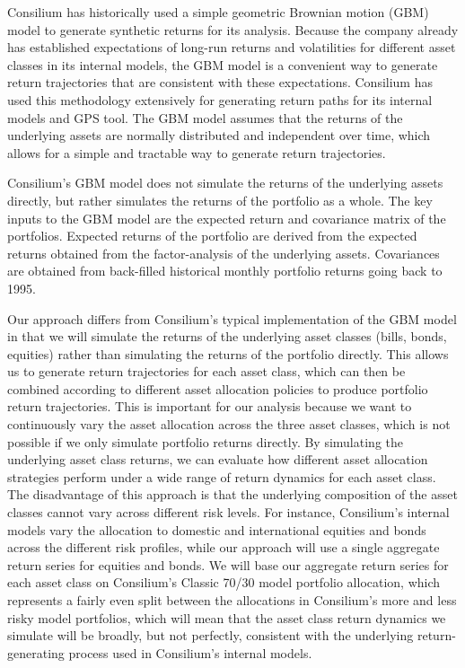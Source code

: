 \documentclass[11pt]{article}
\begin{document}
Consilium has historically used a simple geometric Brownian motion (GBM) model to generate synthetic returns for its analysis. Because the company already has established expectations of long-run returns and volatilities for different asset classes in its internal models, the GBM model is a convenient way to generate return trajectories that are consistent with these expectations. Consilium has used this methodology extensively for generating return paths for its internal models and GPS tool. The GBM model assumes that the returns of the underlying assets are normally distributed and independent over time, which allows for a simple and tractable way to generate return trajectories.

Consilium's GBM model does not simulate the returns of the underlying assets directly, but rather simulates the returns of the portfolio as a whole. The key inputs to the GBM model are the expected return and covariance matrix of the portfolios. Expected returns of the portfolio are derived from the expected returns obtained from the factor-analysis of the underlying assets. Covariances are obtained from back-filled historical monthly portfolio returns going back to 1995.

Our approach differs from Consilium's typical implementation of the GBM model in that we will simulate the returns of the underlying asset classes (bills, bonds, equities) rather than simulating the returns of the portfolio directly. This allows us to generate return trajectories for each asset class, which can then be combined according to different asset allocation policies to produce portfolio return trajectories. This is important for our analysis because we want to continuously vary the asset allocation across the three asset classes, which is not possible if we only simulate portfolio returns directly. By simulating the underlying asset class returns, we can evaluate how different asset allocation strategies perform under a wide range of return dynamics for each asset class. The disadvantage of this approach is that the underlying composition of the asset classes cannot vary across different risk levels. For instance, Consilium's internal models vary the allocation to domestic and international equities and bonds across the different risk profiles, while our approach will use a single aggregate return series for equities and bonds. We will base our aggregate return series for each asset class on Consilium's Classic 70/30 model portfolio allocation, which represents a fairly even split between the allocations in Consilium's more and less risky model portfolios, which will mean that the asset class return dynamics we simulate will be broadly, but not perfectly, consistent with the underlying return-generating process used in Consilium's internal models.
\end{document}
